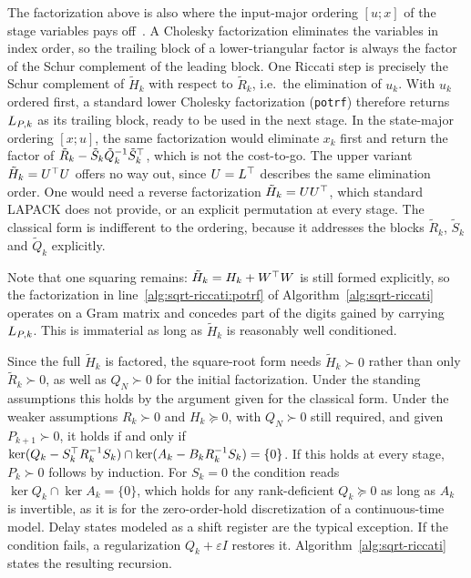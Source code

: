The factorization above is also where the input-major ordering $[u;x]$ of the
stage variables pays off~\cite{frison2020hpipm}. A Cholesky factorization eliminates the variables in
index order, so the trailing block of a lower-triangular factor is always the
factor of the Schur complement of the leading block. One Riccati step is precisely
the Schur complement of $\tilde{H}_k$ with respect to $\tilde{R}_k$, i.e.\ the
elimination of $u_k$. With $u_k$ ordered first, a standard lower Cholesky
factorization (\texttt{potrf}) therefore returns $L_{P,k}$ as its trailing block,
ready to be used in the next stage. In the state-major ordering $[x;u]$, the same
factorization would eliminate $x_k$ first and return the factor of
$\tilde{R}_k - \tilde{S}_k \tilde{Q}_k^{-1} \tilde{S}_k^\top$, which is not the
cost-to-go. The upper variant $\tilde{H}_k = U^\top U$ offers no way out, since
$U = L^\top$ describes the same elimination order. One would need a reverse
factorization $\tilde{H}_k = U U^\top$, which standard LAPACK does not provide, or an
explicit permutation at every stage. The classical form is indifferent to the
ordering, because it addresses the blocks $\tilde{R}_k$, $\tilde{S}_k$ and
$\tilde{Q}_k$ explicitly.

Note that one squaring remains: $\tilde{H}_k = H_k + W^\top W$ is still formed
explicitly, so the factorization in line~\ref{alg:sqrt-riccati:potrf} of
Algorithm~\ref{alg:sqrt-riccati} operates on a
Gram matrix and concedes part of the digits gained by carrying $L_{P,k}$. This is
immaterial as long as $\tilde{H}_k$ is reasonably well conditioned.

Since the full $\tilde{H}_k$ is factored, the square-root form needs
$\tilde{H}_k \succ 0$ rather than only $\tilde{R}_k \succ 0$, as well as
$Q_N \succ 0$ for the initial factorization. Under the standing assumptions this
holds by the argument given for the classical form. Under the weaker assumptions
$R_k\succ0$ and $H_k\succeq0$, with $Q_N\succ0$ still required, and given $P_{k+1}\succ0$,
it holds if and only if
$\ker(Q_k-S_k^\top R_k^{-1}S_k)\cap\ker(A_k-B_kR_k^{-1}S_k)=\{0\}$.
If this holds at every stage, $P_k \succ 0$ follows by induction.
For $S_k=0$ the condition reads $\ker Q_k\cap\ker A_k=\{0\}$, which holds for any rank-deficient
$Q_k\succeq0$ as long as $A_k$ is invertible, as it is for the zero-order-hold
discretization of a continuous-time model. Delay states modeled as a shift register
are the typical exception.
If the condition fails, a regularization $Q_k+\varepsilon I$ restores it.
Algorithm~\ref{alg:sqrt-riccati} states the resulting recursion.

